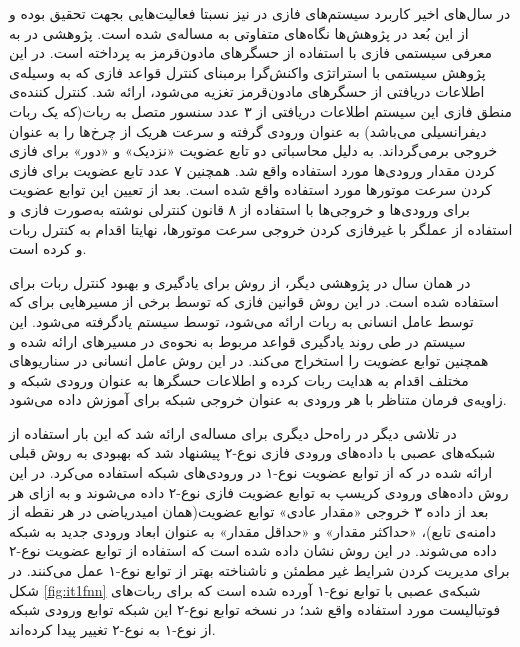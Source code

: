در سال‌های اخیر کاربرد سیستم‌های فازی در  نیز نسبتا فعالیت‌هایی بجهت تحقیق بوده و از این بُعد در پژوهش‌ها نگاه‌های متفاوتی به مساله‌ی  شده است. پژوهشی در  به معرفی سیستمی فازی با استفاده از حسگرهای مادون‌قرمز به  پرداخته است. در این پژوهش سیستمی با استراتژی واکنش‌گرا برمبنای کنترل قواعد فازی که به وسیله‌ی اطلاعات دریافتی از حسگرهای مادون‌قرمز تغزیه می‌شود، ارائه شد. کنترل کننده‌ی منطق فازی این سیستم اطلاعات دریافتی از ۳ عدد سنسور متصل به ربات(که یک ربات دیفرانسیلی می‌باشد) به عنوان ورودی گرفته و سرعت هریک از چرخ‌ها را به عنوان خروجی برمی‌گرداند. به دلیل محاسباتی دو تابع عضویت «نزدیک» و «دور» برای فازی کردن مقدار ورودی‌ها مورد استفاده واقع شد. همچنین ۷ عدد تابع عضویت برای فازی کردن سرعت موتورها مورد استفاده واقع شده است. بعد از تعیین این توابع عضویت برای ورودی‌ها و خروجی‌ها با استفاده از ۸ قانون کنترلی نوشته به‌صورت فازی و استفاده از عملگر  با غیرفازی کردن خروجی سرعت موتورها، نهایتا اقدام به کنترل ربات و  کرده است.

در همان سال در پژوهشی دیگر، از روش  برای یادگیری و بهبود کنترل ربات برای  استفاده شده است. در این روش قوانین فازی که توسط برخی از مسیرهایی برای  که توسط عامل انسانی به ربات ارائه می‌شود، توسط سیستم  یادگرفته می‌شود. این سیستم در طی روند یادگیری قواعد مربوط به نحوه‌ی  در مسیرهای ارائه شده و همچنین توابع عضویت را استخراج می‌کند. در این روش عامل انسانی در سناریو‌های مختلف اقدام به هدایت ربات کرده و اطلاعات حسگرها به عنوان ورودی شبکه و زاویه‌ی فرمان متناظر با هر ورودی به عنوان خروجی شبکه برای آموزش داده می‌شود.

در تلاشی دیگر در  راه‌حل دیگری برای مساله‌ی  ارائه شد که این بار استفاده‌ از شبکه‌های عصبی با داده‌های ورودی فازی نوع-۲ پیشنهاد شد که بهبودی به روش قبلی ارائه شده در  که از توابع عضویت نوع-۱ در ورودی‌های شبکه استفاده می‌کرد. در این روش داده‌های ورودی کریسپ به توابع عضویت فازی نوع-۲ داده می‌شوند و به ازای هر بعد از داده ۳ خروجی «مقدار عادی» توابع عضویت(همان امیدریاضی در هر نقطه از دامنه‌ی تابع)، «حداکثر مقدار» و «حداقل مقدار» به عنوان ابعاد ورودی جدید به شبکه داده می‌شوند. در این روش نشان داده شده است که استفاده از توابع عضویت نوع-۲ برای مدیریت کردن شرایط غیر مطمئن و ناشناخته بهتر از توابع نوع-۱ عمل می‌کنند. در شکل \ref{fig:it1fnn} شبکه‌ی عصبی با توابع نوع-۱ آورده شده است که برای ربات‌های فوتبالیست مورد استفاده واقع شد؛ در نسخه توابع نوع-۲ این شبکه توابع ورودی شبکه از نوع-۱ به نوع-۲ تغییر پیدا کرده‌اند.

